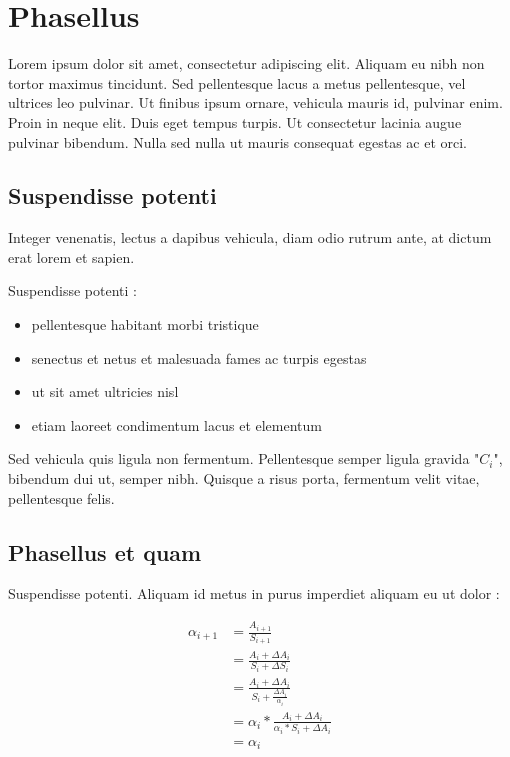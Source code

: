 \section{Phasellus} \label{sec:phasellus}

Lorem ipsum dolor sit amet, consectetur adipiscing elit. Aliquam eu nibh non
tortor maximus tincidunt. Sed pellentesque lacus a metus pellentesque, vel
ultrices leo pulvinar. Ut finibus ipsum ornare, vehicula mauris id, pulvinar
enim. Proin in neque elit. Duis eget tempus turpis. Ut consectetur lacinia
augue pulvinar bibendum. Nulla sed nulla ut mauris consequat egestas ac et orci.

\subsection{Suspendisse potenti}

Integer venenatis, lectus a dapibus vehicula, diam odio rutrum ante, at dictum
erat lorem et sapien.

Suspendisse potenti :

\begin{itemize}
\item{pellentesque habitant morbi tristique}
\item{senectus et netus et malesuada fames ac turpis egestas}
\item{ut sit amet ultricies nisl}
\item{etiam laoreet condimentum lacus et elementum}
\end{itemize}

Sed vehicula quis ligula non fermentum. Pellentesque semper ligula gravida "$C_i$",
bibendum dui ut, semper nibh. Quisque a risus porta, fermentum velit vitae,
pellentesque felis.

\newpage
\subsection{Phasellus et quam}

Suspendisse potenti. Aliquam id metus in purus imperdiet aliquam eu ut dolor :

\begin{highlight}
\begin{align}
\alpha_{i+1} &= \frac{A_{i+1}}{S_{i+1}} \\
             &= \frac{A_i + \Delta A_i}{S_i + \Delta S_i} \\
             &= \frac{A_i + \Delta A_i}{S_i + \frac{\Delta A_i}{\alpha_i}} \\
             &= \alpha_i * \frac{A_i + \Delta A_i}{\alpha_i * S_i + \Delta A_i} \\
             &= \alpha_i
\end{align}
\end{highlight}

